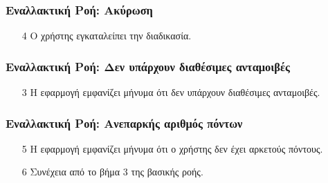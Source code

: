 \subsubsection{Εναλλακτική Ροή: Ακύρωση}

\begin{enumerate}
    \item[4] Ο χρήστης εγκαταλείπει την διαδικασία.
\end{enumerate}

\subsubsection{Εναλλακτική Ροή: Δεν υπάρχουν διαθέσιμες ανταμοιβές}

\begin{enumerate}
    \item[3] Η εφαρμογή εμφανίζει μήνυμα ότι δεν υπάρχουν διαθέσιμες ανταμοιβές.
\end{enumerate}

\subsubsection{Εναλλακτική Ροή: Ανεπαρκής αριθμός πόντων}

\begin{enumerate}
    \item[5] Η εφαρμογή εμφανίζει μήνυμα ότι ο χρήστης δεν έχει αρκετούς πόντους.
    \item[6] Συνέχεια από το βήμα 3 της βασικής ροής.
\end{enumerate}
